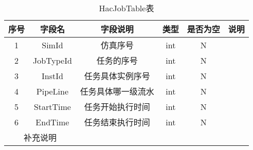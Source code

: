 \begin{table}[!h]
    \centering\normalsize
    \caption{HacJobTable表}
    \begin{tabular}{|c|c|c|c|c|c|}
    \hline
    \textbf{序号} & \textbf{字段名} & \textbf{字段说明} & \textbf{类型} & \textbf{是否为空} & \textbf{说明} \\ \hline
    1           & SimId        & 仿真序号          & int         & N             &             \\ \hline
    2           & JobTypeId    & 任务的序号         & int         & N             &             \\ \hline
    3           & InstId       & 任务具体实例序号      & int         & N             &             \\ \hline
    4           & PipeLine     & 任务具体哪一级流水     & int         & N             &             \\ \hline
    5           & StartTime    & 任务开始执行时间      & int         & N             &             \\ \hline
    6           & EndTime      & 任务结束执行时间      & int         & N             &             \\ \hline
    \multicolumn{2}{|c|}{补充说明} &               &             &               &             \\ \hline
    \end{tabular}
    \end{table}
